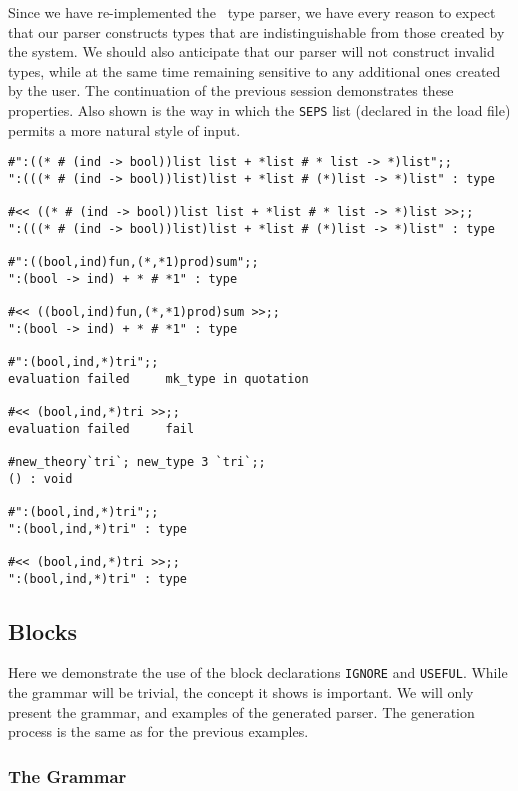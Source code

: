 Since we have re-implemented the \HOL\ type parser, we have every reason
to expect that our parser constructs types that are indistinguishable from
those created by the system.  We should also anticipate that our parser
will not construct invalid types, while at the same time remaining sensitive
to any additional ones created by the user.  The continuation of the previous
session demonstrates these properties.  Also shown is the way in which the
\verb"SEPS" list (declared in the load file) permits a more natural style
of input.
\begin{center}
\begin{session}
\begin{verbatim}
#":((* # (ind -> bool))list list + *list # * list -> *)list";;
":(((* # (ind -> bool))list)list + *list # (*)list -> *)list" : type

#<< ((* # (ind -> bool))list list + *list # * list -> *)list >>;;
":(((* # (ind -> bool))list)list + *list # (*)list -> *)list" : type

#":((bool,ind)fun,(*,*1)prod)sum";;
":(bool -> ind) + * # *1" : type

#<< ((bool,ind)fun,(*,*1)prod)sum >>;;
":(bool -> ind) + * # *1" : type

#":(bool,ind,*)tri";;
evaluation failed     mk_type in quotation

#<< (bool,ind,*)tri >>;;
evaluation failed     fail

#new_theory`tri`; new_type 3 `tri`;;
() : void

#":(bool,ind,*)tri";;
":(bool,ind,*)tri" : type

#<< (bool,ind,*)tri >>;;
":(bool,ind,*)tri" : type
\end{verbatim}
\end{session}
\end{center}

\subsection{Blocks}
 
Here we demonstrate the use of the block declarations 
\verb"IGNORE" and 
\verb"USEFUL".  While the grammar will be 
trivial, the concept it shows is
important.  We will only present the grammar, and examples of the generated
parser.  The generation process is the same as for the previous examples.

\subsubsection{The Grammar}

